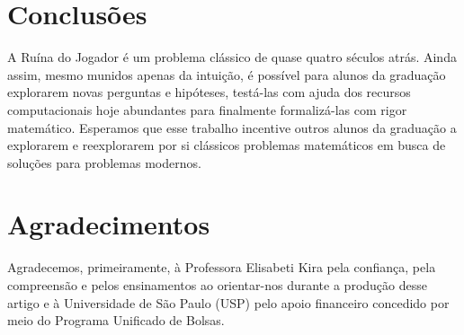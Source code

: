 \documentclass[a4paper,10pt,twocolumn]{article}
\begin{document}
\section{Conclusões}

A Ruína do Jogador é um problema clássico de quase quatro séculos atrás. Ainda
assim, mesmo munidos apenas da intuição, é possível para alunos da graduação
explorarem novas perguntas e hipóteses, testá-las com ajuda dos recursos
computacionais hoje abundantes para finalmente formalizá-las com rigor
matemático. Esperamos que esse trabalho incentive outros alunos da graduação a
explorarem e reexplorarem por si clássicos problemas matemáticos em busca de
soluções para problemas modernos.

\section{Agradecimentos}

Agradecemos, primeiramente, à Professora Elisabeti Kira pela confiança, pela
compreensão e pelos ensinamentos ao orientar-nos durante a produção desse artigo
e à Universidade de São Paulo (USP) pelo apoio financeiro concedido por meio do
Programa Unificado de Bolsas.

\vspace{2.5pt}


\end{document}
